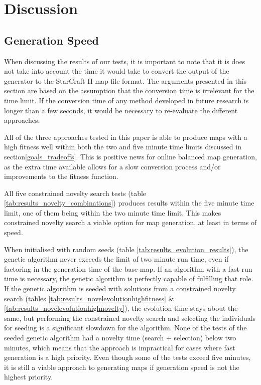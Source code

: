 \chapter{Discussion}
\label{discussion_quality}

\section{Generation Speed}
\label{discussion_speed}
When discussing the results of our tests, it is important to note that it is does not take into account the time it would take to convert the output of the generator to the StarCraft II map file format. The arguments presented in this section are based on the assumption that the conversion time is irrelevant for the time limit. If the conversion time of any method developed in future research is longer than a few seconds, it would be necessary to re-evaluate the different approaches.

All of the three approaches tested in this paper is able to produce maps with a high fitness well within both the two and five minute time limits discussed in section\ref{goals_tradeoffs}. This is positive news for online balanced map generation, as the extra time available allows for a slow conversion process and/or improvements to the fitness function.

All five constrained novelty search tests (table \ref{tab:results_novelty_combinations}) produces results within the five minute time limit, one of them being within the two minute time limit. This makes constrained novelty search a viable option for map generation, at least in terms of speed.

When initialised with random seeds (table \ref{tab:results_evolution_results}), the genetic algorithm never exceeds the limit of two minute run time, even if factoring in the generation time of the base map. If an algorithm with a fast run time is necessary, the genetic algorithm is perfectly capable of fulfilling that role. If the genetic algorithm is seeded with solutions from a constrained novelty search (tables \ref{tab:results_novelevolutionhighfitness} \& \ref{tab:results_novelevolutionhighnovelty}), the evolution time stays about the same, but performing the constrained novelty search and selecting the individuals for seeding is a significant slowdown for the algorithm. None of the tests of the seeded genetic algorithm had a novelty time (search + selection) below two minutes, which means that the approach is impractical for cases where fast generation is a high priority. Even though some of the tests exceed five minutes, it is still a viable approach to generating maps if generation speed is not the highest priority.

